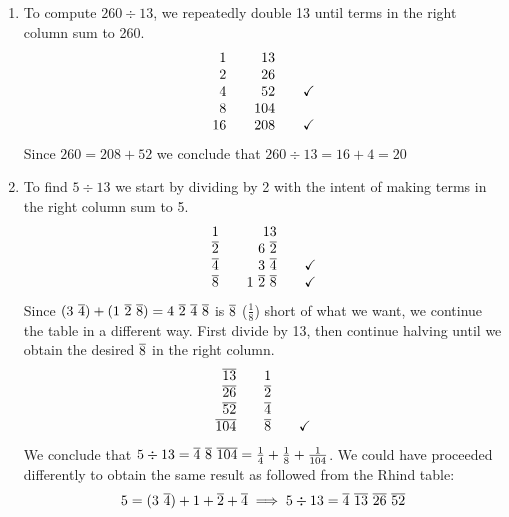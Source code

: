 \begin{enumerate}
	\item To compute $260\div 13$, we repeatedly double 13 until terms in the right column sum to 260.
	\[
		\begin{array}{r@{\qquad}r@{\qquad}c}
			1&13\\
			2&26\\
			4&52&\checkmark\\
			8&104\\
			16&208&\checkmark
		\end{array}
	\]
	Since $260=208+52$ we conclude that $260\div 13=16+4=20$


	\item To find $5\div 13$ we start by dividing by 2 with the intent of making terms in the right column sum to 5.
	\[
		\begin{array}{r@{\qquad}r@{\qquad}c}
1&13\\
			\cl 2&6\ \cl 2\\
			\cl 4&3\ \cl 4&\checkmark\\
			\cl 8&1\ \cl 2\ \cl 8&\checkmark
		\end{array}
	\]
	Since $(3\ \overline{4})+(1\ \overline{2}\ \overline{8})=4\ \overline{2}\ \overline{4}\ \overline{8}$ is $\overline{8}$ ($\frac 18$) short of what we want, we continue the table in a different way. First divide by 13, then continue halving until we obtain the desired $\overline{8}$ in the right column.
	\[
		\begin{array}{r@{\qquad}r@{\qquad}c}
			\cl{13}&1\\
			\cl{26}&\cl 2\\
			\cl{52}&\cl 4\\
			\cl{104}&\cl 8&\checkmark
		\end{array}
	\]
	We conclude that $5\div 13=\overline{4}\ \overline{8}\ \overline{104} =\frac 14+\frac 18+\frac 1{104}$. We could have proceeded differently to obtain the same result as followed from the Rhind table:
	\[
		5=(3\ \overline{4})+1+\overline{2}+\overline{4}\implies 5\div 13=\overline{4}\ \overline{13}\ \overline{26}\ \overline{52}
	\]
\end{enumerate}

\goodbreak




